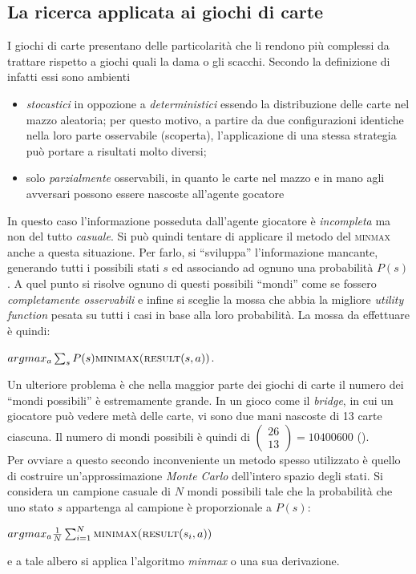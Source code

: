 \subsection{La ricerca applicata ai giochi di carte}

I giochi di carte presentano delle particolarità che li rendono più complessi da trattare rispetto a giochi quali la dama o gli scacchi.
Secondo la definizione di \cite{randw} infatti essi sono ambienti
\begin{itemize}
   \item \emph{stocastici} in oppozione a \emph{deterministici} essendo la distribuzione delle carte nel mazzo aleatoria; per questo motivo, a partire da due configurazioni identiche nella loro parte osservabile (scoperta), l'applicazione di una stessa strategia può portare a risultati molto diversi;
   \item solo \emph{parzialmente} osservabili, in quanto le carte nel mazzo e in mano agli avversari possono essere nascoste all'agente gocatore
\end{itemize}
In questo caso l'informazione posseduta dall'agente giocatore è \emph{incompleta} ma non del tutto \emph{casuale}.
Si può quindi tentare di applicare il metodo del \textsc{minmax} anche a questa situazione.
Per farlo, si ``sviluppa'' l'informazione mancante, generando tutti i possibili stati $s$ ed associando ad ognuno una probabilità $P(s)$.
A quel punto si risolve ognuno di questi possibili ``mondi'' come se fossero \emph{completamente osservabili} e infine si sceglie la mossa che abbia la migliore \emph{utility function} pesata su tutti i casi in base alla loro probabilità.
La mossa da effettuare è quindi:

\begin{center}
$ argmax_a \sum_{s} P(s) \textsc{minimax(result}(s,a)) $.\\
\end{center}
Un ulteriore problema è che nella maggior parte dei giochi di carte il numero dei ``mondi possibili'' è estremamente grande.
In un gioco come il \emph{bridge}, in cui un giocatore può vedere metà delle carte, vi sono due mani nascoste di 13 carte ciascuna.
Il numero di mondi possibili è quindi di $ \left(\! \begin{array}{c} 26 \\  13\end{array}\!\right)  = 10 400 600 $ (\cite{randw}).\\
Per ovviare a questo secondo inconveniente un metodo spesso utilizzato è quello di costruire un'approssimazione \emph{Monte Carlo} dell'intero spazio degli stati.
Si considera un campione casuale di $N$ mondi possibili tale che la probabilità che uno stato $s$ appartenga al campione è proporzionale a $P(s)$:

\begin{center}
$argmax_a \frac{1}{N} \sum_{i=1}^{N}  \textsc{minimax(result}(s_i,a)) $ \cite{randw}\\
\end{center}
e a tale albero si applica l'algoritmo \emph{minmax} o una sua derivazione.
